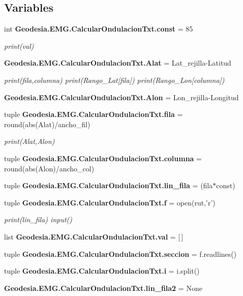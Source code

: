 \subsection*{Variables}
\begin{DoxyCompactItemize}
\item 
int {\bf Geodesia.\-E\-M\-G.\-Calcular\-Ondulacion\-Txt.\-const} = 85
\begin{DoxyCompactList}\small\item\em print(val) \end{DoxyCompactList}\item 
{\bf Geodesia.\-E\-M\-G.\-Calcular\-Ondulacion\-Txt.\-Alat} = Lat\-\_\-rejilla-\/Latitud
\begin{DoxyCompactList}\small\item\em print(fila,columna) print(\-Rango\-\_\-\-Lat[fila]) print(\-Rango\-\_\-\-Lon[columna]) \end{DoxyCompactList}\item 
{\bf Geodesia.\-E\-M\-G.\-Calcular\-Ondulacion\-Txt.\-Alon} = Lon\-\_\-rejilla-\/Longitud
\item 
tuple {\bf Geodesia.\-E\-M\-G.\-Calcular\-Ondulacion\-Txt.\-fila} = round(abs(Alat)/ancho\-\_\-fil)
\begin{DoxyCompactList}\small\item\em print(\-Alat,\-Alon) \end{DoxyCompactList}\item 
tuple {\bf Geodesia.\-E\-M\-G.\-Calcular\-Ondulacion\-Txt.\-columna} = round(abs(Alon)/ancho\-\_\-col)
\item 
tuple {\bf Geodesia.\-E\-M\-G.\-Calcular\-Ondulacion\-Txt.\-lin\-\_\-fila} = (fila$\ast$const)
\item 
tuple {\bf Geodesia.\-E\-M\-G.\-Calcular\-Ondulacion\-Txt.\-f} = open(rut,'r')
\begin{DoxyCompactList}\small\item\em print(lin\-\_\-fila) input() \end{DoxyCompactList}\item 
list {\bf Geodesia.\-E\-M\-G.\-Calcular\-Ondulacion\-Txt.\-val} = [$\,$]
\item 
tuple {\bf Geodesia.\-E\-M\-G.\-Calcular\-Ondulacion\-Txt.\-seccion} = f.\-readlines()
\item 
tuple {\bf Geodesia.\-E\-M\-G.\-Calcular\-Ondulacion\-Txt.\-i} = i.\-split()
\item 
{\bf Geodesia.\-E\-M\-G.\-Calcular\-Ondulacion\-Txt.\-lin\-\_\-fila2} = None
\item 

\end{DoxyCompactItemize}
